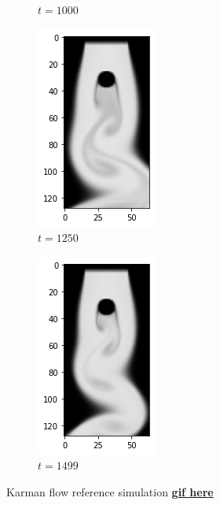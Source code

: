 \documentclass[a4paper,12pt,twoside]{report}
\begin{document}
\begin{figure}[p]
\begin{subfigure}{0.18\textwidth}
		\caption{$t=1000$}
	\end{subfigure}
	\begin{subfigure}{0.18\textwidth}
		\centering
		\includegraphics[scale=0.5]{karmanflow/ref_density_001250.png}
		\caption{$t=1250$}
	\end{subfigure}
	\begin{subfigure}{0.18\textwidth}
		\centering
		\includegraphics[scale=0.5]{karmanflow/ref_density_001499.png}
		\caption{$t=1499$}
	\end{subfigure}
	\caption{Karman flow reference simulation \href{https://github.com/w191444052/sol-data/blob/master/karman_high/ref.gif}{\bf{gif here}}}
	\label{sol karman high ref}
\end{figure}
\end{document}
